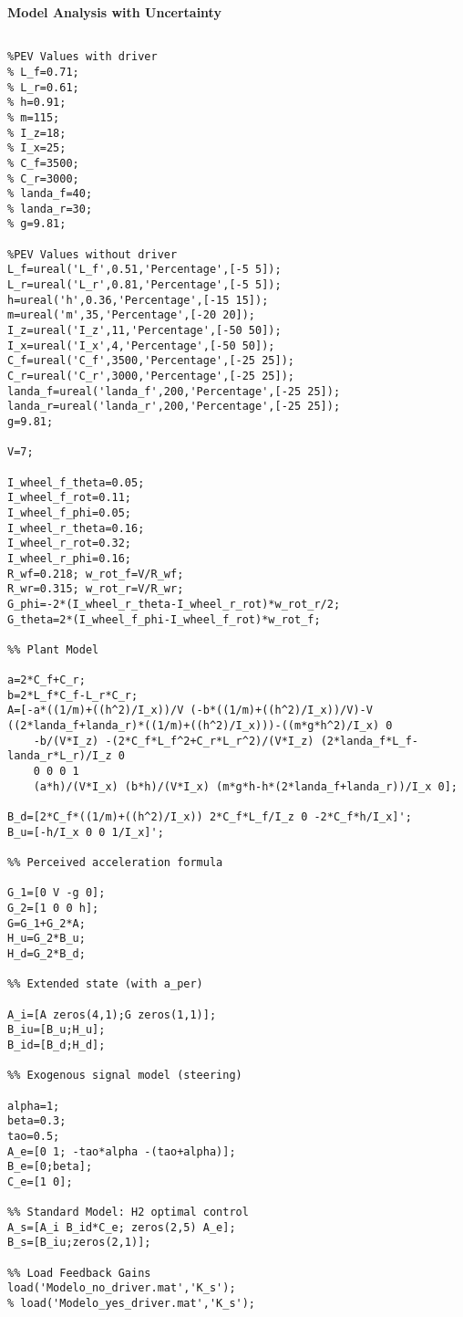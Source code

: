 \textbf{Model Analysis with Uncertainty}
\begin{lstlisting}[style=codematlab]
%% Parameters

%PEV Values with driver
% L_f=0.71;
% L_r=0.61;
% h=0.91;
% m=115;
% I_z=18;
% I_x=25;
% C_f=3500;
% C_r=3000;
% landa_f=40;
% landa_r=30;
% g=9.81;

%PEV Values without driver
L_f=ureal('L_f',0.51,'Percentage',[-5 5]);
L_r=ureal('L_r',0.81,'Percentage',[-5 5]);
h=ureal('h',0.36,'Percentage',[-15 15]);
m=ureal('m',35,'Percentage',[-20 20]);
I_z=ureal('I_z',11,'Percentage',[-50 50]);
I_x=ureal('I_x',4,'Percentage',[-50 50]);
C_f=ureal('C_f',3500,'Percentage',[-25 25]);
C_r=ureal('C_r',3000,'Percentage',[-25 25]);
landa_f=ureal('landa_f',200,'Percentage',[-25 25]);
landa_r=ureal('landa_r',200,'Percentage',[-25 25]);
g=9.81;

V=7;

I_wheel_f_theta=0.05;
I_wheel_f_rot=0.11;
I_wheel_f_phi=0.05;
I_wheel_r_theta=0.16;
I_wheel_r_rot=0.32;
I_wheel_r_phi=0.16;
R_wf=0.218; w_rot_f=V/R_wf; 
R_wr=0.315; w_rot_r=V/R_wr; 
G_phi=-2*(I_wheel_r_theta-I_wheel_r_rot)*w_rot_r/2;
G_theta=2*(I_wheel_f_phi-I_wheel_f_rot)*w_rot_f;

%% Plant Model

a=2*C_f+C_r;
b=2*L_f*C_f-L_r*C_r;
A=[-a*((1/m)+((h^2)/I_x))/V (-b*((1/m)+((h^2)/I_x))/V)-V ((2*landa_f+landa_r)*((1/m)+((h^2)/I_x)))-((m*g*h^2)/I_x) 0 
    -b/(V*I_z) -(2*C_f*L_f^2+C_r*L_r^2)/(V*I_z) (2*landa_f*L_f-landa_r*L_r)/I_z 0
    0 0 0 1
    (a*h)/(V*I_x) (b*h)/(V*I_x) (m*g*h-h*(2*landa_f+landa_r))/I_x 0];

B_d=[2*C_f*((1/m)+((h^2)/I_x)) 2*C_f*L_f/I_z 0 -2*C_f*h/I_x]';
B_u=[-h/I_x 0 0 1/I_x]';

%% Perceived acceleration formula

G_1=[0 V -g 0];
G_2=[1 0 0 h];
G=G_1+G_2*A;
H_u=G_2*B_u;
H_d=G_2*B_d;

%% Extended state (with a_per)

A_i=[A zeros(4,1);G zeros(1,1)];
B_iu=[B_u;H_u];
B_id=[B_d;H_d];

%% Exogenous signal model (steering)

alpha=1;
beta=0.3;
tao=0.5;
A_e=[0 1; -tao*alpha -(tao+alpha)];
B_e=[0;beta];
C_e=[1 0];

%% Standard Model: H2 optimal control
A_s=[A_i B_id*C_e; zeros(2,5) A_e];
B_s=[B_iu;zeros(2,1)];

%% Load Feedback Gains
load('Modelo_no_driver.mat','K_s');
% load('Modelo_yes_driver.mat','K_s');


\end{lstlisting}
